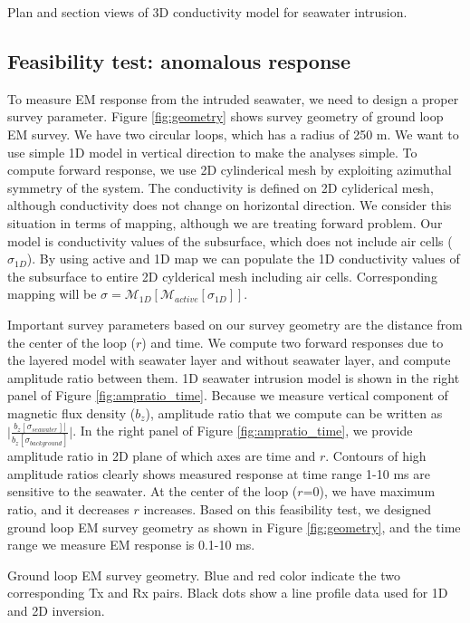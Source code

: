 \documentclass{segabs}
\begin{document}
{Plan and section views of 3D conductivity model for seawater intrusion.}

\subsection*{Feasibility test: anomalous response}
To measure EM response from the intruded seawater, we need to design a proper survey parameter. Figure \ref{fig:geometry} shows survey geometry of ground loop EM survey. We have two circular loops, which has a radius of 250 m. We want to use simple 1D model in vertical direction to make the analyses simple. 
To compute forward response, we use 2D cylinderical mesh by exploiting azimuthal symmetry of the system. The conductivity is defined on 2D cyliderical mesh, although conductivity does not change on horizontal direction. We consider this situation in terms of mapping, although we are treating forward problem. Our model is conductivity values of the subsurface, which does not include air cells ($\sigma_{1D}$). By using active and 1D map we can populate the 1D conductivity values of the subsurface to entire 2D cylderical mesh including air cells. Corresponding mapping will be $\sigma = \mathcal{M}_{1D}[\mathcal{M}_{active}[\sigma_{1D}]]$. 

Important survey parameters based on our survey geometry are the distance from the center of the loop ($r$) and time. We compute two forward responses due to the layered model with seawater layer and without seawater layer, and compute amplitude ratio between them. 1D seawater intrusion model is shown in the right panel of Figure \ref{fig:ampratio_time}. Because we measure vertical component of magnetic flux density ($b_z$), amplitude ratio that we compute can be written as $\Big|\frac{b_z[\sigma_{seawater}]|}{b_z[\sigma_{background}]}\Big|$. In the right panel of Figure \ref{fig:ampratio_time}, we provide amplitude ratio in 2D plane of which axes are time and $r$. Contours of high amplitude ratios clearly shows measured response at time range 1-10 ms are sensitive to the seawater. At the center of the loop ($r$=0), we have maximum ratio, and it decreases $r$ increases. Based on this feasibility test, we designed ground loop EM survey geometry as shown in Figure \ref{fig:geometry}, and the time range we measure EM response is 0.1-10 ms.

{Ground loop EM survey geometry. Blue and red color indicate the two corresponding Tx and Rx pairs. Black dots show a line profile data used for 1D and 2D inversion. }
\end{document}
